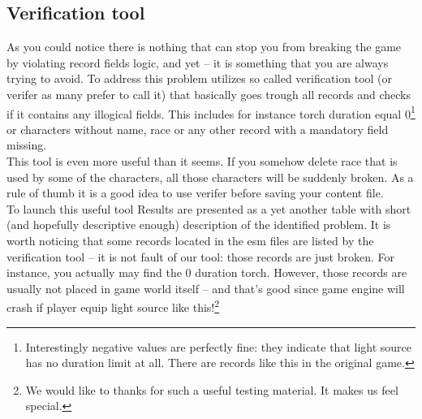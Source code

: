 \subsection{Verification tool}
As you could notice there is nothing that can stop you from breaking the game by violating record fields logic, and yet -- it is something that you are always trying to avoid. To address this problem \OCS{} utilizes so called verification tool (or verifer as many prefer to call it) that basically goes trough all records and checks if it contains any illogical fields. This includes for instance torch duration equal 0\footnote{Interestingly negative values are perfectly fine: they indicate that light source has no duration limit at all. There are records like this in the original game.} or characters without name, race or any other record with a mandatory field missing.\\
This tool is even more useful than it seems. If you somehow delete race that is used by some of the characters, all those characters will be suddenly broken. As a rule of thumb it is a good idea to use verifer before saving your content file.\\
To launch this useful tool %
Results are presented as a yet another table with short (and hopefully descriptive enough) description of the identified problem. It is worth noticing that some records located in the \MW{} esm files are listed by the verification tool -- it is not fault of our tool: those records are just broken. For instance, you actually may find the 0 duration torch. However, those records are usually not placed in game world itself -- and that's good since \MW{} game engine will crash if player equip light source like this!\footnote{We would like to thanks \BS{} for such a useful testing material. It makes us feel special.}
